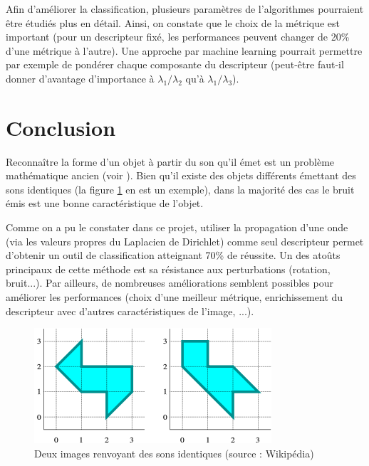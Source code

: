 \documentclass[a4paper,10pt]{article} %
\theoremstyle{definition} %
\begin{document}
Afin d'améliorer la classification, plusieurs paramètres de l'algorithmes pourraient être étudiés plus en détail. Ainsi, on constate que le choix de la métrique est important (pour un descripteur fixé, les performances peuvent changer de 20\% d'une métrique à l'autre). Une approche par machine learning pourrait permettre par exemple de pondérer chaque composante du descripteur (peut-être faut-il donner d'avantage d'importance à $\lambda_1/\lambda_2$ qu'à $\lambda_1/\lambda_3$).



\section{Conclusion}

Reconnaître la forme d'un objet à partir du son qu'il émet est un problème mathématique ancien (voir \cite{kac1966can}). Bien qu'il existe des objets différents émettant des sons identiques (la figure \ref{drum} en est un exemple), dans la majorité des cas le bruit émis est une bonne caractéristique de l'objet.

Comme on a pu le constater dans ce projet, utiliser la propagation d'une onde (via les valeurs propres du Laplacien de Dirichlet) comme seul descripteur permet d'obtenir un outil de classification atteignant 70\% de réussite. Un des atoûts principaux de cette méthode est sa résistance aux perturbations (rotation, bruit...). Par ailleurs, de nombreuses améliorations semblent possibles pour améliorer les performances (choix d'une meilleur métrique, enrichissement du descripteur avec d'autres caractéristiques de l'image, ...).

\begin{figure}[H]
  \begin{center}
  \includegraphics[scale=0.5]{drums.png}    
  \end{center}
\caption{Deux images renvoyant des sons identiques (source : Wikipédia)}
\label{drum}
\end{figure}
\end{document}
